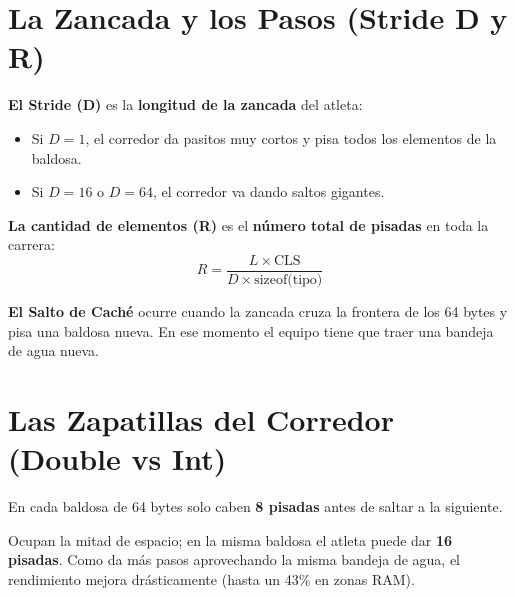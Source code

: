 \documentclass[12pt,a4paper]{article}
\begin{document}
\section{La Zancada y los Pasos (Stride D y R)}
\label{sec:stride}

\begin{tcolorbox}[analogia, title={Analogía: el stride y el número de accesos}]
\textbf{El Stride (D)} es la \textbf{longitud de la zancada} del atleta:
\begin{itemize}[leftmargin=1.5em]
  \item Si $D=1$, el corredor da pasitos muy cortos y pisa todos los elementos de la baldosa.
  \item Si $D=16$ o $D=64$, el corredor va dando saltos gigantes.
\end{itemize}

\vspace{6pt}
\textbf{La cantidad de elementos (R)} es el \textbf{número total de pisadas} en toda la carrera:
\[
  R = \frac{L \times \text{CLS}}{D \times \text{sizeof(tipo)}}
\]

\vspace{4pt}
\textbf{El Salto de Caché} ocurre cuando la zancada cruza la frontera de los 64 bytes y pisa una baldosa nueva. En ese momento el equipo tiene que traer una bandeja de agua nueva.
\end{tcolorbox}

\section{Las Zapatillas del Corredor (Double vs Int)}
\label{sec:tipos}

\begin{tcolorbox}[analogia, title={Analogía: el tipo de dato como equipamiento}]
\begin{description}[leftmargin=1.5em, itemsep=6pt]
  \item[Double (8 bytes) --- Botas pesadas:] En cada baldosa de 64 bytes solo caben \textbf{8 pisadas} antes de saltar a la siguiente.
  \item[Int (4 bytes) --- Zapatillas de clavos:] Ocupan la mitad de espacio; en la misma baldosa el atleta puede dar \textbf{16 pisadas}. Como da más pasos aprovechando la misma bandeja de agua, el rendimiento mejora drásticamente (hasta un 43\% en zonas RAM).
\end{description}
\end{tcolorbox}
\end{document}
